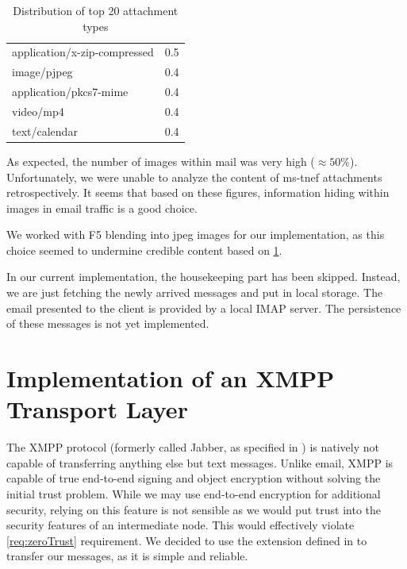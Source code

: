 \begin{table}[ht]
\begin{tabular}{l|r}
		application/x-zip-compressed                                                &    0.5\\
		image/pjpeg                                                                 &    0.4\\
		application/pkcs7-mime                                                      &    0.4\\
		video/mp4                                                                   &    0.4\\
		text/calendar                                                               &    0.4\\\hline
	\end{tabular}
	\caption{Distribution of top 20 attachment types}
	\label{tab:emailAttachments}
\end{table}

As expected, the number of images within mail was very high ($\approx 50\%$). Unfortunately, we were unable to analyze the content of ms-tnef attachments retrospectively. It seems that based on these figures, information hiding within images in email traffic is a good choice.

We worked with F5 blending into jpeg images for our implementation, as this choice seemed to undermine credible content based on \cref{tab:emailAttachments}.

In our current implementation, the housekeeping part has been skipped. Instead, we are just fetching the newly arrived messages and put in local storage. The email presented to the client is provided by a local IMAP server. The persistence of these messages is not yet implemented. 

\section{Implementation of an XMPP Transport Layer}
The XMPP protocol (formerly called  Jabber, as specified in \cite{rfc6120}) is natively not capable of transferring anything else but text messages. Unlike email, XMPP is capable of true end-to-end signing and object encryption without solving the initial trust problem. While we may use end-to-end encryption for additional security, relying on this feature is not sensible as we would put trust into the security features of an intermediate node. This would effectively violate \ref{req:zeroTrust} requirement. We decided to use the extension defined in \cite{xep0231} to transfer our messages, as it is simple and reliable.

